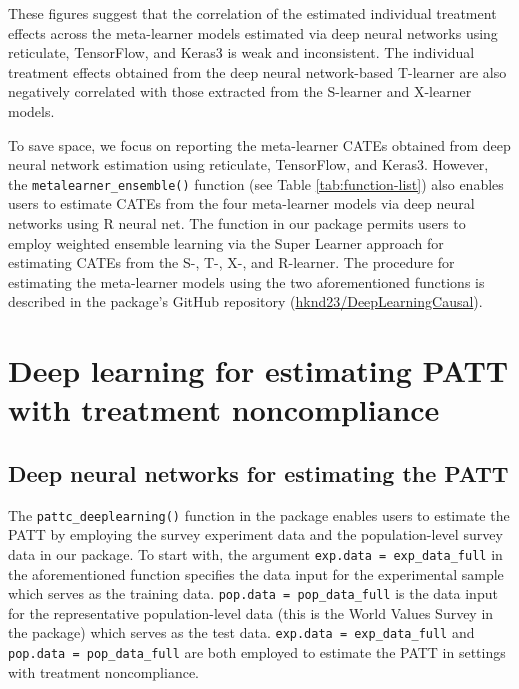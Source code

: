 These figures suggest that the correlation of the estimated individual
treatment effects across the meta-learner models estimated via deep
neural networks using reticulate, TensorFlow, and Keras3 is weak and
inconsistent. The individual treatment effects obtained from the deep
neural network-based T-learner are also negatively correlated with those
extracted from the S-learner and X-learner models.

To save space, we focus on reporting the meta-learner CATEs obtained
from deep neural network estimation using reticulate, TensorFlow, and
Keras3. However, the \texttt{metalearner\_ensemble()} function (see Table \ref{tab:function-list}) also enables users to estimate CATEs
from the four meta-learner models via deep neural networks using R
neural net. The function in our package permits users to employ weighted
ensemble learning via the Super Learner approach for estimating CATEs
from the S-, T-, X-, and R-learner. The procedure for estimating the
meta-learner models using the two aforementioned functions is described
in the package's GitHub repository
(\href{https://github.com/hknd23/DeepLearningCausal}{hknd23/DeepLearningCausal}).

\section{Deep learning for estimating PATT with treatment noncompliance}\label{deep-learning-for-estimating-patt-with-treatment-noncompliance}

\subsection{Deep neural networks for estimating the PATT}\label{deep-neural-networks-for-estimating-the-patt}

The \texttt{pattc\_deeplearning()} function in the 
package enables users to estimate the PATT by employing the survey
experiment data and the population-level survey data in our package. To
start with, the argument
\texttt{exp.data\ =\ exp\_data\_full} in the aforementioned function specifies the
data input for the experimental sample which serves as the training
data. \texttt{pop.data\ =\ pop\_data\_full} is the data input for the
representative population-level data (this is the World Values Survey in
the package) which serves as the test data. \texttt{exp.data\ =\ exp\_data\_full}
and \texttt{pop.data\ =\ pop\_data\_full} are both employed to estimate the PATT in
settings with treatment noncompliance.

